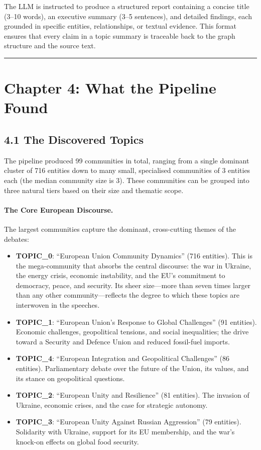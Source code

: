\documentclass[11pt]{article}
\begin{document}
The LLM is instructed to produce a structured report containing a concise title (3--10 words), an executive summary (3--5 sentences), and detailed findings, each grounded in specific entities, relationships, or textual evidence. This format ensures that every claim in a topic summary is traceable back to the graph structure and the source text.

\hrule

\section{Chapter 4: What the Pipeline Found}

\subsection{4.1 The Discovered Topics}

The pipeline produced 99 communities in total, ranging from a single dominant cluster of 716 entities down to many small, specialised communities of 3 entities each (the median community size is 3). These communities can be grouped into three natural tiers based on their size and thematic scope.

\paragraph{The Core European Discourse.}
The largest communities capture the dominant, cross-cutting themes of the debates:

\begin{itemize}
  \item \textbf{TOPIC\_0}: ``European Union Community Dynamics'' (716 entities). This is the mega-community that absorbs the central discourse: the war in Ukraine, the energy crisis, economic instability, and the EU's commitment to democracy, peace, and security. Its sheer size---more than seven times larger than any other community---reflects the degree to which these topics are interwoven in the speeches.
  \item \textbf{TOPIC\_1}: ``European Union's Response to Global Challenges'' (91 entities). Economic challenges, geopolitical tensions, and social inequalities; the drive toward a Security and Defence Union and reduced fossil-fuel imports.
  \item \textbf{TOPIC\_4}: ``European Integration and Geopolitical Challenges'' (86 entities). Parliamentary debate over the future of the Union, its values, and its stance on geopolitical questions.
  \item \textbf{TOPIC\_2}: ``European Unity and Resilience'' (81 entities). The invasion of Ukraine, economic crises, and the case for strategic autonomy.
  \item \textbf{TOPIC\_3}: ``European Unity Against Russian Aggression'' (79 entities). Solidarity with Ukraine, support for its EU membership, and the war's knock-on effects on global food security.
\end{itemize}
\end{document}
